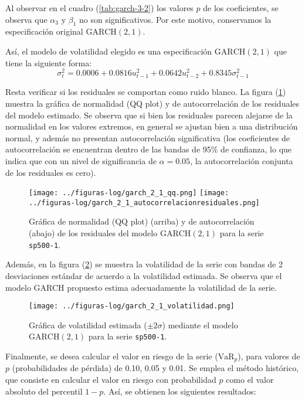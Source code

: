 \documentclass{article}
\begin{document}
Al observar en el cuadro (\ref{tab:garch-3-2}) los valores $p$ de los coeficientes, se observa que $\alpha_3$ y $\beta_1$ no son significativos. Por este motivo, conservamos la especificación original $\mathrm{GARCH(2, 1)}$.

Así, el modelo de volatilidad elegido es una especificación $\mathrm{GARCH}(2, 1)$ que tiene la siguiente forma:
\[ \sigma^2_t = 0.0006 + 0.0816 u^2_{t-1} + 0.0642 u^2_{t-2} + 0.8345 \sigma^2_{t-1} \]

Resta verificar si los residuales se comportan como ruido blanco. La figura (\ref{fig:garch-2-1-residuales}) muestra la gráfica de normalidad (QQ plot) y de autocorrelación de los residuales del modelo estimado. Se observa que si bien los residuales parecen alejarse de la normalidad en los valores extremos, en general se ajustan bien a una distribución normal, y además no presentan autocorrelación significativa (los coeficientes de autocorrelación se encuentran dentro de las bandas de 95\% de confianza, lo que indica que con un nivel de significancia de $\alpha=0.05$, la autocorrelación conjunta de los residuales es cero).

\begin{figure}[H]
\centering
\texttt{[image: ../figuras-log/garch\_2\_1\_qq.png]}
\texttt{[image: ../figuras-log/garch\_2\_1\_autocorrelacionresiduales.png]}
\caption{\label{fig:garch-2-1-residuales}Gráfica de normalidad (QQ plot) (arriba) y de autocorrelación (abajo) de los residuales del modelo $\mathrm{GARCH(2, 1)}$ para la serie \texttt{sp500-1}.}
\end{figure}

Además, en la figura (\ref{fig:garch-2-1-volatilidad}) se muestra la volatilidad de la serie con bandas de 2 desviaciones estándar de acuerdo a la volatilidad estimada. Se observa que el modelo GARCH propuesto estima adecuadamente la volatilidad de la serie.

\begin{figure}[H]
\centering
\texttt{[image: ../figuras-log/garch\_2\_1\_volatilidad.png]}
\caption{\label{fig:garch-2-1-volatilidad}Gráfica de volatilidad estimada ($\pm 2\sigma$) mediante el modelo $\mathrm{GARCH}(2,1)$ para la serie \texttt{sp500-1}.}
\end{figure}

Finalmente, se desea calcular el valor en riesgo de la serie ($\mathrm{VaR}_p$), para valores de $p$ (probabilidades de pérdida) de 0.10, 0.05 y 0.01. Se emplea el método histórico, que consiste en calcular el valor en riesgo con probabilidad $p$ como el valor absoluto del percentil $1-p$. Así, se obtienen los siguientes resultados:
\end{document}
